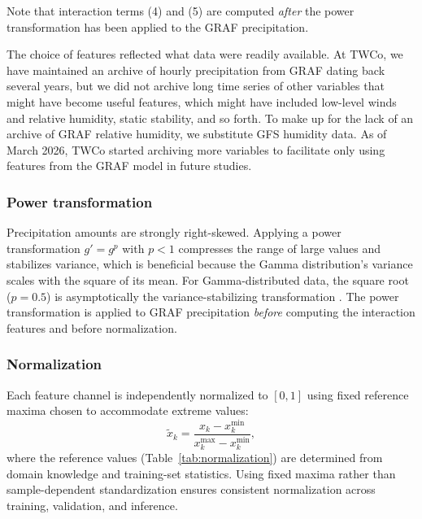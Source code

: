 \documentclass[11pt]{article}
\begin{document}
Note that interaction terms (4) and (5) are computed \emph{after}
the power transformation has been applied to the GRAF precipitation.

The choice of features reflected what data were readily available. At TWCo,
we have maintained an archive of hourly precipitation from GRAF dating back
several years, but we did not archive long time series of other variables that
might have become useful features, which might have included low-level winds
and relative humidity, static stability, and so forth.   To make up for the lack
of an archive of GRAF relative humidity, we substitute GFS humidity data.   
As of March 2026, TWCo started archiving more variables to facilitate only 
using features from the GRAF model in future studies.

\subsubsection{Power transformation}
\label{sec:power}

Precipitation amounts are strongly right-skewed.  Applying a power
transformation $g' = g^p$ with $p < 1$ compresses the range of
large values and stabilizes variance, which is beneficial because
the Gamma distribution's variance scales with the square of its
mean.  For Gamma-distributed data, the square root ($p = 0.5$) is
asymptotically the variance-stabilizing transformation
\citep{bartlett1936}.  The power transformation is applied to
GRAF precipitation \emph{before} computing the interaction
features and before normalization.

\subsubsection{Normalization}
\label{sec:normalization}

Each feature channel is independently normalized to $[0, 1]$ using
fixed reference maxima chosen to accommodate extreme values:
\begin{equation}
  \tilde{x}_k = \frac{x_k - x_k^{\min}}{x_k^{\max} - x_k^{\min}},
  \label{eq:normalization}
\end{equation}
where the reference values (Table~\ref{tab:normalization}) are
determined from domain knowledge and training-set statistics.
Using fixed maxima rather than sample-dependent standardization
ensures consistent normalization across training, validation, and
inference.
\end{document}
